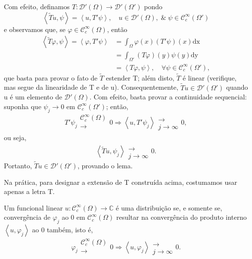 \documentclass[../distribution_theory_notes.tex]{subfiles}
\begin{document}
\begin{proof*}
	Com efeito, definamos \(T:\mathcal{D}'(\Omega )\rightarrow \mathcal{D}'(\Omega ')\) pondo
	\[
		\left< \tilde{T}u, \psi  \right> = \left< u, T'\psi  \right>,\quad u\in \mathcal{D}'(\Omega ),\;\&\;\psi \in \mathcal{C}_{c}^{\infty}(\Omega ')
	\]
	e observamos que, se \(\varphi \in \mathcal{C}_{c}^{\infty}(\Omega )\), então
	\begin{align*}
		\left< \tilde{T}\varphi , \psi  \right> = \left< \varphi , T'\psi  \right> & = \int_{\Omega }^{}\varphi (x)(T'\psi )(x) \mathrm{dx}                                       \\
		                                                                           & = \int_{\Omega '}^{}(T\varphi )(y)\psi (y) \mathrm{dy}                                       \\
		                                                                           & = \left< T\varphi , \psi  \right>,\quad \forall \psi \in \mathcal{C}_{c}^{\infty}(\Omega '),
	\end{align*}
	que basta para provar o fato de \(\tilde{T}\) estender T; além disto, \(\tilde{T}\) é linear (verifique, mas segue da linearidade de T e de u). Consequentemente, \(\tilde{T}u\in \mathcal{D}'(\Omega ')\) quando u é um elemento de \(\mathcal{D}'(\Omega )\). Com efeito, basta provar a continuidade sequencial: suponha que \(\psi_{j}\rightarrow 0\) em \(\mathcal{C}_{c}^{\infty}(\Omega ')\); então,
	\[
		T'\psi_{j}\substack{\mathcal{C}_{c}^{\infty}(\Omega ) \\ \longrightarrow \\ }0 \Rightarrow \left< u, T'\psi_{j} \right>\substack{ \\ \longrightarrow \\ j\to \infty}0,
	\]
	ou seja,
	\[
		\left< \tilde{T}u, \psi_{j} \right>\substack{ \\ \longrightarrow \\ j\to \infty}0.
	\]
	Portanto, \(\tilde{T}u\in \mathcal{D}'(\Omega ')\), provando o lema. \qedsymbol
\end{proof*}
\begin{tcolorbox}[
		skin=enhanced,
		title=Observação,
		fonttitle=\bfseries,
		colframe=black,
		colbacktitle=cyan!75!white,
		colback=cyan!15,
		colbacklower=black,
		coltitle=black,
		drop fuzzy shadow,
	]
	Na prática, para designar a extensão de T construída acima, costumamos usar apenas a letra T.
\end{tcolorbox}
\begin{lemma*}
	Um funcional linear \(u:\mathcal{C}_{c}^{\infty}(\Omega )\rightarrow \mathbb{C}\) é uma distribuição se, e somente se,  convergência de \(\varphi_{j}\) ao 0 em \(\mathcal{C}_{c}^{\infty}(\Omega )\) resultar na convergência do produto interno \(\left< u, \varphi_{j} \right>\) ao 0 também, isto é,
	\[
		\varphi_{j}\substack{\mathcal{C}_{c}^{\infty}(\Omega ) \\ \longrightarrow \\ }0 \Rightarrow \left< u, \varphi_{j} \right>\substack{ \\ \longrightarrow \\ j\to\infty}0.
	\]
\end{lemma*}
\end{document}

